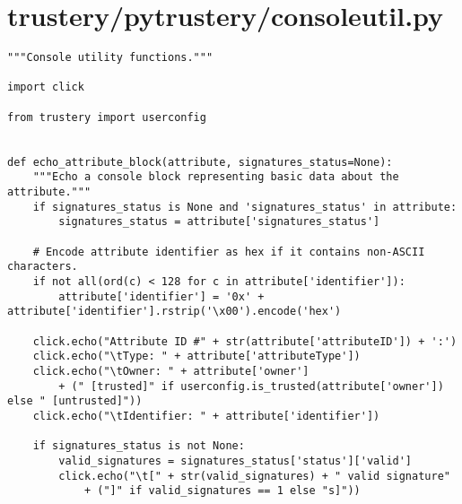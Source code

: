 \documentclass[12pt]{report}
\begin{document}
	\section{trustery/pytrustery/consoleutil.py}
	\begin{lstlisting}
"""Console utility functions."""

import click

from trustery import userconfig


def echo_attribute_block(attribute, signatures_status=None):
    """Echo a console block representing basic data about the attribute."""
    if signatures_status is None and 'signatures_status' in attribute:
        signatures_status = attribute['signatures_status']

    # Encode attribute identifier as hex if it contains non-ASCII characters.
    if not all(ord(c) < 128 for c in attribute['identifier']):
        attribute['identifier'] = '0x' + attribute['identifier'].rstrip('\x00').encode('hex')

    click.echo("Attribute ID #" + str(attribute['attributeID']) + ':')
    click.echo("\tType: " + attribute['attributeType'])
    click.echo("\tOwner: " + attribute['owner']
        + (" [trusted]" if userconfig.is_trusted(attribute['owner']) else " [untrusted]"))
    click.echo("\tIdentifier: " + attribute['identifier'])

    if signatures_status is not None:
        valid_signatures = signatures_status['status']['valid']
        click.echo("\t[" + str(valid_signatures) + " valid signature"
            + ("]" if valid_signatures == 1 else "s]"))
	\end{lstlisting}
	
\end{document}

